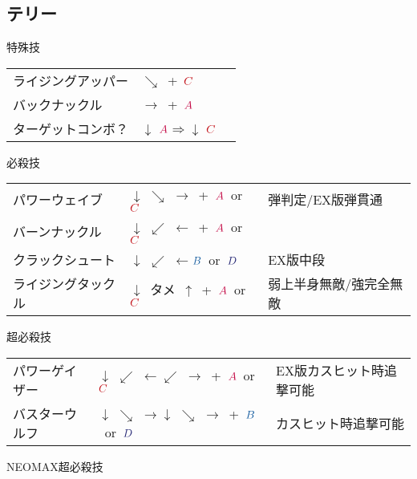 \documentclass[a4j,11pt]{jarticle}
\def\A{$\textcolor{Acolor}{A}$}
\def\C{$\textcolor{Ccolor}{C}$}
\def\B{$\textcolor{Bcolor}{B}$}
\def\D{$\textcolor{Dcolor}{D}$}
\def\hado{$\downarrow$ $\searrow$ $\rightarrow$}%
\def\tatsu{$\downarrow$ $\swarrow$ $\leftarrow$}%
\def\Cancel{$\Longrightarrow$}
\begin{document}
\subsection{テリー}
\begin{itembox}[l]{特殊技}
\begin{tabular}{lll}
ライジングアッパー&$\searrow$\ +\ \C&\\
バックナックル&$\rightarrow$\ +\ \A&\\
ターゲットコンボ？&$\downarrow$ \A \Cancel $\downarrow$ \C
\end{tabular}
\end{itembox}
\begin{itembox}[l]{必殺技}
\begin{tabular}{lll}
パワーウェイブ&\hado\ +\ \A\ or\ \C&弾判定/EX版弾貫通\\
バーンナックル&\tatsu\ +\ \A\ or\ \C&\\
クラックシュート&\tatsu \B\ or\ \D&EX版中段\\
ライジングタックル&$\downarrow$\ タメ\ $\uparrow$\ +\ \A\ or\ \C&弱上半身無敵/強完全無敵
\end{tabular}
\end{itembox}
\begin{itembox}[l]{超必殺技}
\begin{tabular}{lll}
パワーゲイザー&\tatsu $\swarrow$ $\rightarrow$\ +\ \A\ or\ \C&EX版カスヒット時追撃可能\\
バスターウルフ&\hado\hado\ +\ \B\ or\ \D&カスヒット時追撃可能
\end{tabular}
\end{itembox}
\begin{itembox}[l]{NEOMAX超必殺技}
\end{itembox}
\newpage
\end{document}
